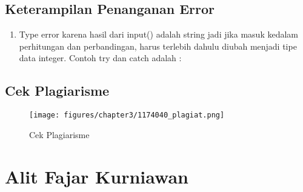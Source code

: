     \subsection{Keterampilan Penanganan Error}
        \begin{enumerate}
            \item Type error karena hasil dari input() adalah string jadi jika masuk kedalam perhitungan dan perbandingan, harus terlebih dahulu diubah menjadi tipe data integer.
            Contoh try dan catch adalah :

            
        \end{enumerate}
    \subsection{Cek Plagiarisme}
    \begin{figure}[ht]

            \centerline{\texttt{[image: figures/chapter3/1174040\_plagiat.png]}}
            \caption{Cek Plagiarisme}
            \label{1174040_cekplagiat}
            \end{figure}

\section{Alit Fajar Kurniawan}
